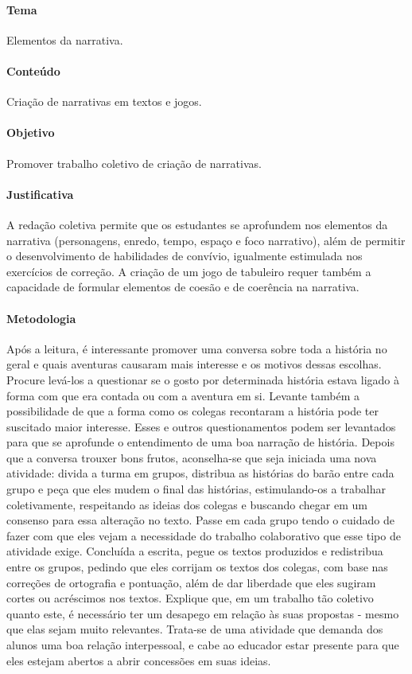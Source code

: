 \documentclass[11pt]{extarticle}
\begin{document}
\paragraph{Tema} Elementos da narrativa.

\paragraph{Conteúdo} Criação de narrativas em textos e jogos.  

\paragraph{Objetivo} Promover trabalho coletivo de criação de narrativas.  

\paragraph{Justificativa} A redação coletiva permite que os estudantes se aprofundem nos elementos da narrativa (personagens, enredo, tempo, espaço e foco narrativo), além de permitir o desenvolvimento de habilidades de convívio, igualmente estimulada nos exercícios de correção. A criação de um jogo de tabuleiro requer também a capacidade de formular elementos de coesão e de coerência na narrativa. 

\paragraph{Metodologia} Após a leitura, é interessante promover uma conversa sobre toda a história no geral e quais aventuras causaram mais interesse e os motivos dessas escolhas. Procure levá-los a questionar se o gosto por determinada história estava ligado à forma com que era contada ou com a aventura em si. Levante também a possibilidade de que a forma como os colegas recontaram a história pode ter suscitado maior interesse. Esses e outros questionamentos podem ser levantados para que se aprofunde o entendimento de uma boa narração de história. Depois que a conversa trouxer bons frutos, aconselha-se que seja iniciada uma nova atividade: divida a turma em grupos, distribua as histórias do barão entre cada grupo e peça que eles mudem o final das histórias, estimulando-os a trabalhar coletivamente, respeitando as ideias dos colegas e buscando chegar em um consenso para essa alteração no texto. Passe em cada grupo tendo o cuidado de fazer com que eles vejam a necessidade do trabalho colaborativo que esse tipo de atividade exige. Concluída a escrita, pegue os textos produzidos e redistribua entre os grupos, pedindo que eles corrijam os textos dos colegas, com base nas correções de ortografia e pontuação, além de dar liberdade que eles sugiram cortes ou acréscimos nos textos. Explique que, em um trabalho tão coletivo quanto este, é necessário ter um desapego em relação às suas propostas - mesmo que elas sejam muito relevantes. Trata-se de uma atividade que demanda dos alunos uma boa relação interpessoal, e cabe ao educador estar presente para que eles estejam abertos a abrir concessões em suas ideias. 
\end{document}
